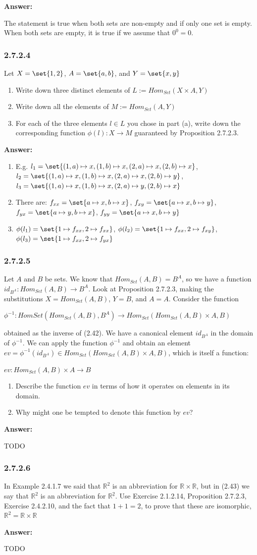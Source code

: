 \documentclass{article}
\newcommand{\Rational}{\mathbb{R}}
\newcommand{\vsp}[0]{\vspace*{10pt}\par}
\newcommand{\exercise}[1]{\subsubsection*{#1}}
\newcommand{\ans}[0]{\vsp\textbf{Answer: }\vsp}
\newcommand{\ei}{\item}
\newcommand{\eb}{\begin{enumerate}[label=(\alph*)]\ei}
\newcommand{\ee}{\end{enumerate}}
\begin{document}
\ans

The statement is true when both sets are non-empty and if only one set is empty.
When both sets are empty, it is true if we assume that $0^0 = 0$.

\exercise{2.7.2.4}

Let $X = \set{1, 2}$, $A = \set{a, b}$, and $Y = \set{x, y}$

\eb Write down three distinct elements of $L := Hom_{Set}(X \times A, Y)$
\ei Write down all the elements of $M := Hom_{Set}(A, Y)$
\ei For each of the three elements $l \in L$ you chose in part (a), write down
    the corresponding function $\phi(l): X \to M$ guaranteed by Proposition
    2.7.2.3.
\ee

\ans

\eb E.g.
    $l_1 = \set{(1,a) \mapsto x, (1,b) \mapsto x, (2,a) \mapsto x, (2,b) \mapsto x}$,
    $l_2 = \set{(1,a) \mapsto x, (1,b) \mapsto x, (2,a) \mapsto x, (2,b) \mapsto y}$,
    $l_3 = \set{(1,a) \mapsto x, (1,b) \mapsto x, (2,a) \mapsto y, (2,b) \mapsto x}$
\ei There are:
    $f_{xx} = \set{a \mapsto x, b \mapsto x}$,
    $f_{xy} = \set{a \mapsto x, b \mapsto y}$,
    $f_{yx} = \set{a \mapsto y, b \mapsto x}$,
    $f_{yy} = \set{a \mapsto x, b \mapsto y}$
\ei $\phi(l_1) = \set{1 \mapsto f_{xx}, 2 \mapsto f_{xx}}$,
    $\phi(l_2) = \set{1 \mapsto f_{xx}, 2 \mapsto f_{xy}}$,
    $\phi(l_3) = \set{1 \mapsto f_{xx}, 2 \mapsto f_{yx}}$
\ee

\exercise{2.7.2.5}

Let $A$ and $B$ be sets.  We know that $Hom_{Set}(A, B) = B^A$, so we have a
function $id_{B^A} : Hom_{Set}(A, B) \to B^A$. Look at Proposition 2.7.2.3,
making the substitutions $X = Hom_{Set}(A, B)$, $Y = B$, and $A = A$. Consider
the function

\vsp

$\phi^{-1} : Hom{Set}(Hom_{Set}(A, B), B^A) \to Hom_{Set}(Hom_{Set}(A, B) \times A, B)$

\vsp

obtained as the inverse of (2.42).  We have a canonical element $id_{B^A}$ in
the domain of $\phi^{-1}$.  We can apply the function $\phi^{-1}$ and obtain an
element $ev = \phi^{-1}(id_{B^A}) \in Hom_{Set}(Hom_{Set}(A, B) \times A, B)$,
which is itself a function:

\vsp
$ev: Hom_{Set}(A, B) \times A \to B$
\vsp

\eb Describe the function $ev$ in terms of how it operates on elements in its domain.
\ei Why might one be tempted to denote this function by $ev$?
\ee

\ans

TODO

\exercise{2.7.2.6}

In Example 2.4.1.7 we said that $\Rational^2$ is an abbreviation for $\Rational
\times \Rational$, but in (2.43) we say that $\Rational^2$ is an abbreviation
for $\Rational^{\underline{2}}$. Use Exercise 2.1.2.14, Proposition 2.7.2.3,
Exercise 2.4.2.10, and the fact that $1+1=2$, to prove that these are
isomorphic, $\Rational^2 = \Rational \times \Rational$

\ans

TODO

\vsp
\vsp
\vsp
\vsp

\printbibliography
\end{document}
